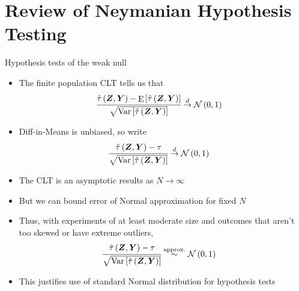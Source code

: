 \documentclass[table, xcolor = {dvipsnames}, 9pt]{beamer}
\theoremstyle{plain}
\DeclareMathOperator{\E}{\rm{E}}
\DeclareMathOperator{\Var}{\rm{Var}}
\begin{document}
\section{Review of Neymanian Hypothesis Testing}
\begin{frame}{Hypothesis tests of the weak null} \vfill
\begin{itemize} \vfill
\item The finite population CLT tells us that \vfill
\begin{align*}
\cfrac{\hat{\tau}\left(\bm{Z}, \bm{Y}\right) - \E\left[\hat{\tau}\left(\bm{Z}, \bm{Y}\right)\right]}{\sqrt{\Var\left[\hat{\tau}\left(\bm{Z}, \bm{Y}\right)\right]}} & \overset{d}{\to} \mathcal{N}\left(0, 1\right)
\end{align*} \vfill
\item Diff-in-Means is unbiased, so write \vfill
\begin{align*}
\cfrac{\hat{\tau}\left(\bm{Z}, \bm{Y}\right) - \tau}{\sqrt{\Var\left[\hat{\tau}\left(\bm{Z}, \bm{Y}\right)\right]}} & \overset{d}{\to} \mathcal{N}\left(0, 1\right)
\end{align*} \vfill
\item The CLT is an asymptotic results as $N \to \infty$ \vfill
\item But we can bound error of Normal approximation for fixed $N$ \vfill
\item Thus, with experiments of at least moderate size and outcomes that aren't too skewed or have extreme outliers, \vfill
\begin{align*}
\cfrac{\hat{\tau}\left(\bm{Z}, \bm{Y}\right) - \tau}{\sqrt{\Var\left[\hat{\tau}\left(\bm{Z}, \bm{Y}\right)\right]}} & \overset{\text{approx.}}{\sim} \mathcal{N}\left(0, 1\right)
\end{align*} \vfill
\item This justifies use of standard Normal distribution for hypothesis tests \vfill
\end{itemize} \vfill
\end{frame}
\end{document}
